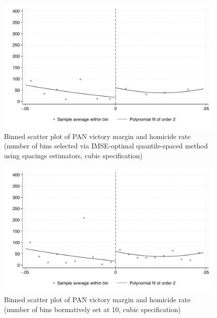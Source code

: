 \documentclass{article}
\begin{document}
\begin{figure}[H]
    \centering
    \includegraphics[scale=0.5]{../outputs/binned_scatter_qs_cubic_plot.pdf}
    \caption{Binned scatter plot of PAN victory margin and homicide rate (number of bins selected via IMSE-optimal quantile-spaced method using spacings estimators, cubic specification)}
    \label{fig:binned_scatter_qs_cubic}
\end{figure}

\begin{figure}[H]
    \centering
    \includegraphics[scale=0.5]{../outputs/binned_scatter_10bins_cubic_plot.pdf}
    \caption{Binned scatter plot of PAN victory margin and homicide rate (number of bins bormatively set at 10, cubic specification)}
    \label{fig:binned_scatter_10bins_cubic}
\end{figure}
\end{document}
